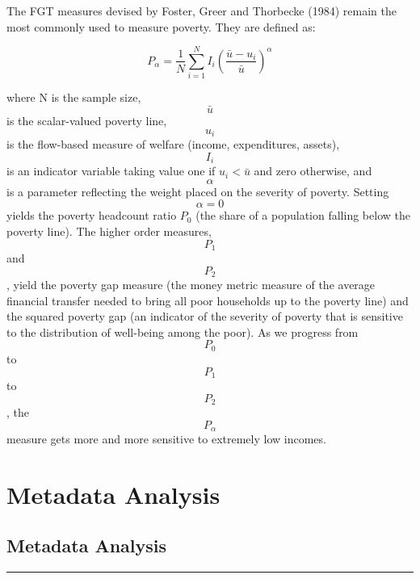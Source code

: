 \documentclass[13 pt,]{book}
\begin{document}
The FGT measures devised by Foster, Greer and Thorbecke (1984) remain
the most commonly used to measure poverty. They are defined as:

\[\begin{equation}
P_{\alpha}=\frac{1}{N}\sum^{N}_{i=1}I_{i}\left(\frac{\bar{u}-u_{i}}{\bar{u}}\right)^{\alpha}
\end{equation}\]

where N is the sample size, \[\bar{u}\] is the scalar-valued poverty
line, \[u_{i}\] is the flow-based measure of welfare (income,
expenditures, assets), \[I_{i}\] is an indicator variable taking value
one if \(u_{i} < \bar{u}\) and zero otherwise, and \[\alpha\] is a
parameter reflecting the weight placed on the severity of poverty.
Setting \[\alpha =0\] yields the poverty headcount ratio \(P_{0}\) (the
share of a population falling below the poverty line). The higher order
measures, \[P_{1}\] and \[P_{2}\], yield the poverty gap measure (the
money metric measure of the average financial transfer needed to bring
all poor households up to the poverty line) and the squared poverty gap
(an indicator of the severity of poverty that is sensitive to the
distribution of well-being among the poor). As we progress from
\[P_{0}\] to \[P_{1}\] to \[P_{2}\], the \[P_{\alpha}\] measure gets
more and more sensitive to extremely low incomes.

\part{Metadata Analysis}\label{part-metadata-analysis}

\chapter{Metadata Analysis}\label{metadata}

\begin{center}\rule{0.5\linewidth}{\linethickness}\end{center}
\end{document}
